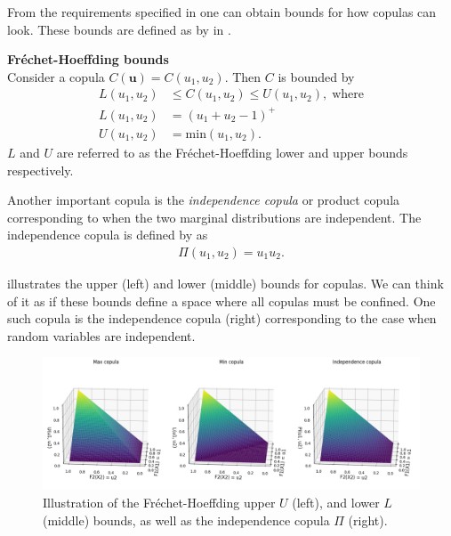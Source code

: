 From the requirements specified in  one can obtain bounds for how copulas can look. These bounds are defined as by  in .
    
\begin{theorem}\label{thm:FrechetBounds}
    \textbf{Fréchet-Hoeffding bounds} \\
    Consider a copula $C(\mathbf{u}) = C(u_1,u_2)$. Then $C$ is bounded by
    \begin{align*}
        L(u_1,u_2) &\leq C(u_1,u_2) \leq U(u_1,u_2),\; \mathrm{ where}\\
        L(u_1,u_2) &= (u_1+u_2-1)^+\\
        U(u_1,u_2) &= \mathrm{min}(u_1,u_2).
    \end{align*}
    $L$ and $U$ are referred to as the Fréchet-Hoeffding lower and upper bounds respectively. 
\end{theorem}

Another important copula is the \emph{independence copula} or product copula corresponding to when the two marginal distributions are independent. The independence copula is defined by  as
\begin{align*}
    \Pi(u_1,u_2) = u_1u_2.
\end{align*}

 illustrates the upper (left) and lower (middle) bounds for copulas. We can think of it as if these bounds define a space where all copulas must be confined. One such copula is the independence copula (right) corresponding to the case when random variables are independent. 

\begin{figure}
    \centering
    \includegraphics[width=1.\linewidth]{3Theory/pictures/FrechetBounds.png}
    \caption{Illustration of the Fréchet-Hoeffding upper $U$ (left), and lower $L$ (middle) bounds, as well as the independence copula $\Pi$ (right).}
    \label{fig:FrechetBounds}
\end{figure}

